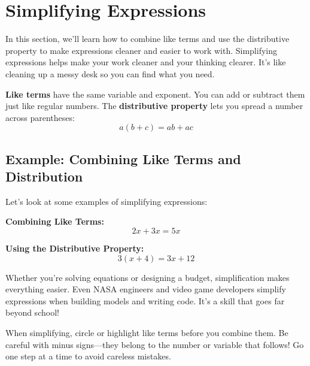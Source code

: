 \cleardoublepage
\section{Simplifying Expressions}

In this section, we'll learn how to combine like terms and use the distributive property to make expressions cleaner and easier to work with. Simplifying expressions helps make your work cleaner and your thinking clearer. It's like cleaning up a messy desk so you can find what you need.

\textbf{Like terms} have the same variable and exponent. You can add or subtract them just like regular numbers. The \textbf{distributive property} lets you spread a number across parentheses:
\[
a(b + c) = ab + ac
\]

\subsection*{Example: Combining Like Terms and Distribution}

Let's look at some examples of simplifying expressions:

\textbf{Combining Like Terms:}
\[
2x + 3x = 5x
\]

\textbf{Using the Distributive Property:}
\[
3(x + 4) = 3x + 12
\]

Whether you're solving equations or designing a budget, simplification makes everything easier. Even NASA engineers and video game developers simplify expressions when building models and writing code. It's a skill that goes far beyond school!

When simplifying, circle or highlight like terms before you combine them. Be careful with minus signs—they belong to the number or variable that follows! Go one step at a time to avoid careless mistakes.





